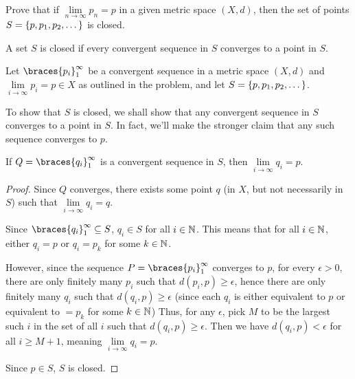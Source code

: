 \begin{problem}
  Prove that if $\lim\limits_{n \to \infty}{p_n} = p$ in a given metric space $(X, d)$,
  then the set of points $S = \left\{p, p_1, p_2, \dots\right\}$ is closed.
\end{problem}
\begin{answer}
  \begin{definition}
    A set $S$ is closed if every convergent sequence in $S$ converges to a point in $S$.
  \end{definition}
  
  \step
  Let $\braces{p_i}_1^\infty$ be a convergent sequence in a metric space $(X, d)$
  and $\lim\limits_{i \to \infty}{p_i} = p \in X$ as outlined in the problem,
  and let $S = \left\{p, p_1, p_2, \dots\right\}$.

  \step
  To show that $S$ is closed, we shall show that any convergent sequence
  in $S$ converges to a point in $S$.
  In fact, we'll make the stronger claim that any such sequence converges to $p$.

  \begin{claim}
    If $Q = \braces{q_i}_1^\infty$ is a convergent sequence in $S$,
    then $\lim\limits_{i \to \infty}{q_i} = p$.
    \begin{proof}
      Since $Q$ converges,
      there exists some point $q$ (in $X$, but not necessarily in $S$)
      such that $\lim\limits_{i \to \infty}{q_i} = q$.
      
      \step
      Since $\braces{q_i}_1^\infty \subseteq S$, $q_i \in S$ for all $i \in \mathbb{N}$.
      This means that for all $i \in \mathbb{N}$, either $q_i = p$ or $q_i = p_k$ for some $k \in \mathbb{N}$.

      \step
      However, since the sequence $P = \braces{p_i}_1^\infty$ converges to $p$,
      for every $\epsilon > 0$, there are only finitely many $p_i$ such that
      $d(p_i, p) \geq \epsilon$, hence there are only finitely many $q_i$
      such that $d(q_i, p) \geq \epsilon$
      (since each $q_i$ is either equivalent to $p$ or equivalent to $ = p_k$ for some $k \in \mathbb{N}$)
      Thus, for any $\epsilon$, pick $M$ to be the largest such $i$
      in the set of all $i$ such that $d(q_i, p) \geq \epsilon$.
      Then we have $d(q_i, p) < \epsilon$ for all $i \geq M+1$,
      meaning $\lim\limits_{i \to \infty}{q_i} = p$.

      \step
      Since $p \in S$, $S$ is closed.
    \end{proof}
  \end{claim}
\end{answer}
